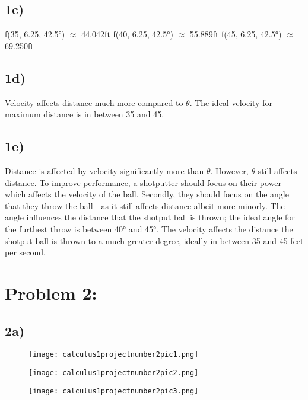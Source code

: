 \documentclass{article}
\begin{document}
\subsection*{1c)}
f(35, 6.25, 42.5°) $\approx$ 44.042ft
\newline
f(40, 6.25, 42.5°) $\approx$ 55.889ft
\newline
f(45, 6.25, 42.5°) $\approx$ 69.250ft
\subsection*{1d)} Velocity affects distance much more compared to $\theta$. The ideal velocity for maximum distance is in between 35 and 45.
\subsection*{1e)}
Distance is affected by velocity significantly more than $\theta$. However, $\theta$ still affects distance. To improve performance, a shotputter should focus on their power which affects the velocity of the ball. Secondly, they should focus on the angle that they throw the ball - as it still affects distance albeit more minorly. The angle influences the distance that the shotput ball is thrown; the ideal angle for the furthest throw is between 40° and 45°. The velocity affects the distance the shotput ball is thrown to a much greater degree, ideally in between 35 and 45 feet per second.

\newpage

\section*{Problem 2:}

\subsection*{2a)}

\begin{figure}[ht]
\centering
\texttt{[image: calculus1projectnumber2pic1.png]}
\end{figure}

\begin{figure}[ht]
\centering
\texttt{[image: calculus1projectnumber2pic2.png]}
\end{figure}

\begin{figure}[ht]
    \centering
    \texttt{[image: calculus1projectnumber2pic3.png]}
\end{figure}
\end{document}
